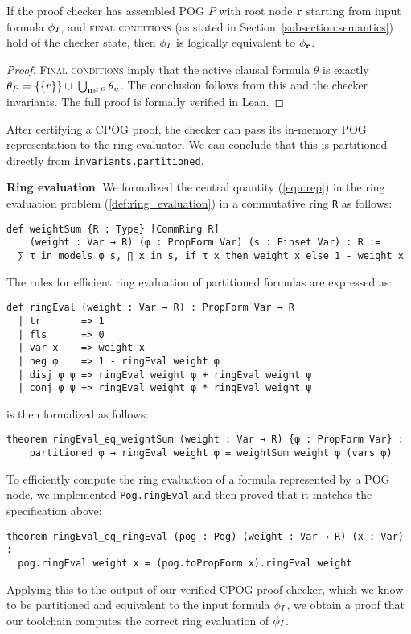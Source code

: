 \begin{theorem}
\label{thm:lean:equiv}
If the proof checker has assembled POG $P$ with root node $\mathbf{r}$ starting from input formula $\phi_I$, and \textsc{final conditions} (as stated in Section~\ref{subsection:semantics}) hold of the checker state, then $\phi_I$ is logically equivalent to $\phi_{\mathbf{r}}$.
\end{theorem}
\begin{proof}
\textsc{Final conditions} imply that the active clausal formula $\theta$ is exactly $\theta_P \doteq \{\{r\}\} \cup \; \bigcup_{\mathbf{u} \in P} \theta_{u}$. The conclusion follows from this and the checker invariants. The full proof is formally verified in Lean.
\end{proof}
After certifying a CPOG proof, the checker can pass its in-memory POG representation to the ring evaluator. We can conclude that this is partitioned directly from \texttt{invariants.partitioned}.

\vspace{1em}\noindent
\textbf{Ring evaluation}. We formalized the central quantity (\ref{eqn:rep}) in the ring evaluation problem
(\cref{def:ring_evaluation}) in a commutative ring \lstinline{R} as follows:
\begin{lstlisting}
def weightSum {R : Type} [CommRing R]
    (weight : Var → R) (φ : PropForm Var) (s : Finset Var) : R :=
  ∑ τ in models φ s, ∏ x in s, if τ x then weight x else 1 - weight x
\end{lstlisting}
The rules for efficient ring evaluation of partitioned formulas are expressed as:
\begin{lstlisting}
def ringEval (weight : Var → R) : PropForm Var → R
  | tr       => 1
  | fls      => 0
  | var x    => weight x
  | neg φ    => 1 - ringEval weight φ
  | disj φ ψ => ringEval weight φ + ringEval weight ψ
  | conj φ ψ => ringEval weight φ * ringEval weight ψ
\end{lstlisting}
 is then formalized as follows:
\begin{lstlisting}
theorem ringEval_eq_weightSum (weight : Var → R) {φ : PropForm Var} :
    partitioned φ → ringEval weight φ = weightSum weight φ (vars φ)
\end{lstlisting}
To efficiently compute the ring evaluation of a formula represented by a POG node, we implemented
\lstinline{Pog.ringEval} and then proved that it matches the specification above:
\begin{lstlisting}
theorem ringEval_eq_ringEval (pog : Pog) (weight : Var → R) (x : Var) :
  pog.ringEval weight x = (pog.toPropForm x).ringEval weight
\end{lstlisting}
Applying this to the output of our verified CPOG proof checker, which we know to be partitioned
and equivalent to the input formula $\phi_I$, we obtain a proof that our toolchain computes
the correct ring evaluation of $\phi_I$.

